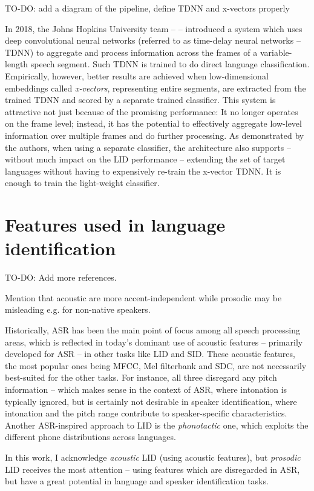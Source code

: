\documentclass[bsc,frontabs,twoside,singlespacing,parskip,deptreport]{infthesis}
\begin{document}
{{    TO-DO: add a diagram of the pipeline, define TDNN and x-vectors properly
    
    In 2018, the Johns Hopkins University team -- \cite{Snyder_et_al_2018} -- introduced a system which uses deep convolutional neural networks (referred to as time-delay neural networks -- TDNN) to aggregate and process information across the frames of a variable-length speech segment. Such TDNN is trained to do direct language classification. Empirically, however, better results are achieved when low-dimensional embeddings called \textit{x-vectors}, representing entire segments, are extracted from the trained TDNN and scored by a separate trained classifier. This system is attractive not just because of the promising performance: It no longer operates on the frame level; instead, it has the potential to effectively aggregate low-level information over multiple frames and do further processing. As demonstrated by the authors, when using a separate classifier, the architecture also supports -- without much impact on the LID performance -- extending the set of target languages without having to expensively re-train the x-vector TDNN. It is enough to train the light-weight classifier.
  }
  \section{Features used in language identification}{
    TO-DO: Add more references.

    Mention that acoustic are more accent-independent while prosodic may be misleading e.g. for non-native speakers.

    Historically, ASR has been the main point of focus among all speech processing areas, which is reflected in today's dominant use of acoustic features -- primarily developed for ASR -- in other tasks like LID and SID. These acoustic features, the most popular ones being MFCC, Mel filterbank and SDC, are not necessarily best-suited for the other tasks. For instance, all three disregard any pitch information -- which makes sense in the context of ASR, where intonation is typically ignored, but is certainly not desirable in speaker identification, where intonation and the pitch range contribute to speaker-specific characteristics. Another ASR-inspired approach to LID is the \textit{phonotactic} one, which exploits the different phone distributions across languages.

    In this work, I acknowledge \textit{acoustic} LID (using acoustic features), but \textit{prosodic} LID receives the most attention -- using features which are disregarded in ASR, but have a great potential in language and speaker identification tasks.

}}
\end{document}
